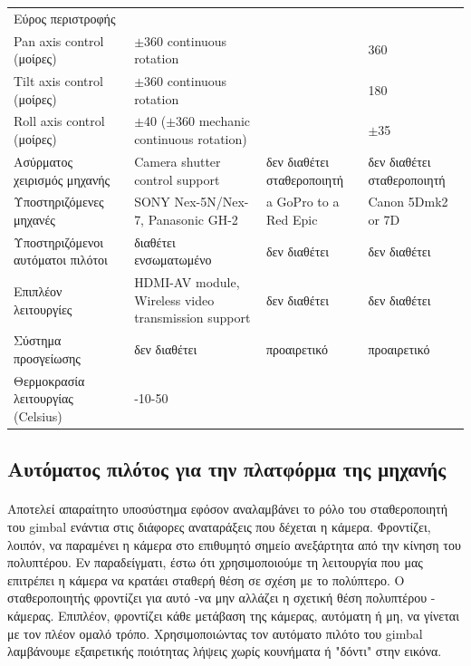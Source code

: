 \documentclass[a4paper, 12pt, twoside]{report}
\begin{document}
{{{{{{\begin{landscape}
\begin{longtable} { m{3cm} m{3.5cm} m{3.5cm} m{3.5cm}}
					\hdashline
					Εύρος περιστροφής & & & \\
					Pan axis control (μοίρες) & $\pm$360 continuous rotation & & 360\\
					Tilt axis control (μοίρες) & $\pm$360 continuous rotation & & 180\\
					Roll axis control (μοίρες) & $\pm$40 ($\pm$360 mechanic continuous rotation) & & $\pm$35\\
					\hdashline
					Ασύρματος χειρισμός μηχανής & Camera shutter control support & δεν διαθέτει σταθεροποιητή & δεν διαθέτει σταθεροποιητή\\
					\hdashline
					Υποστηριζόμενες μηχανές & SONY Nex-5N/Nex-7, Panasonic GH-2 & a GoPro to a Red Epic & Canon 5Dmk2 or 7D\\
					\hdashline
					Υποστηριζόμενοι αυτόματοι πιλότοι & διαθέτει ενσωματωμένο & δεν διαθέτει & δεν διαθέτει\\
					\hdashline
					Επιπλέον λειτουργίες & HDMI-AV module, Wireless video transmission support & δεν διαθέτει & δεν διαθέτει\\
					\hdashline
					Σύστημα προσγείωσης & δεν διαθέτει & προαιρετικό & προαιρετικό\\
					\hdashline
					Θερμοκρασία λειτουργίας (Celsius) & -10-50 & & \\
					\hline
				\end{longtable}
				\end{landscape}
			
		\subsection{Αυτόματος πιλότος για την πλατφόρμα της μηχανής}
			\paragraph{}{Αποτελεί απαραίτητο υποσύστημα εφόσον αναλαμβάνει το ρόλο του σταθεροποιητή του gimbal ενάντια στις διάφορες αναταράξεις που δέχεται η κάμερα. Φροντίζει, λοιπόν, να παραμένει η κάμερα στο επιθυμητό σημείο ανεξάρτητα από την κίνηση του πολυπτέρου. Εν παραδείγματι, έστω ότι χρησιμοποιούμε τη λειτουργία που μας επιτρέπει η κάμερα να κρατάει σταθερή θέση σε σχέση με το πολύπτερο. Ο σταθεροποιητής φροντίζει για αυτό -να μην αλλάζει η σχετική θέση πολυπτέρου - κάμερας. Επιπλέον, φροντίζει κάθε μετάβαση της κάμερας, αυτόματη ή μη, να γίνεται με τον πλέον ομαλό τρόπο. Χρησιμοποιώντας τον αυτόματο πιλότο του gimbal λαμβάνουμε εξαιρετικής ποιότητας λήψεις χωρίς κουνήματα ή "δόντι" στην εικόνα.
			}
}}}}}}
\end{document}
